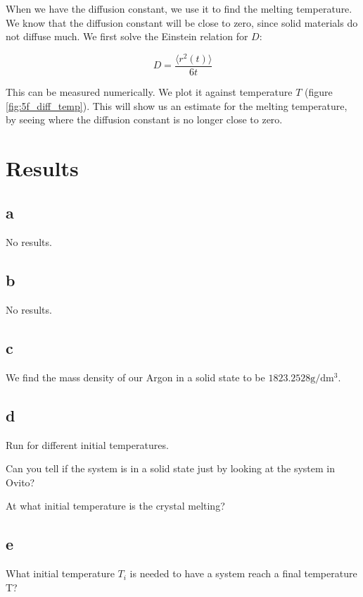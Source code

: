 \documentclass[10pt,showpacs,preprintnumbers,footinbib,amsmath,amssymb,aps,prl,twocolumn,groupedaddress,superscriptaddress,showkeys]{revtex4-1}
\begin{document}
When we have the diffusion constant, we use it to find the melting temperature. We know that the diffusion constant will be close to zero, since solid materials do not diffuse much. We first solve the Einstein relation for $D$:

\begin{equation}
D = \frac{\langle r^2(t)  \rangle}{6t}
\end{equation}


This can be measured numerically. We plot it against temperature $T$ (figure \ref{fig:5f_diff_temp}). This will show us an estimate for the melting temperature, by seeing where the diffusion constant is no longer close to zero.

\section{Results}

\subsection*{a}

No results.

\subsection*{b}

No results.

\subsection*{c}

We find the mass density of our Argon in a solid state to be $1823.2528 \mathrm{g/dm^3}$.

\subsection*{d}

Run for different initial temperatures.

Can you tell if the system is in a solid state just by looking at the system in Ovito?

At what initial temperature is the crystal melting?

\subsection*{e}

What initial temperature $T_i$ is needed to have a system reach a final temperature T?
\end{document}
